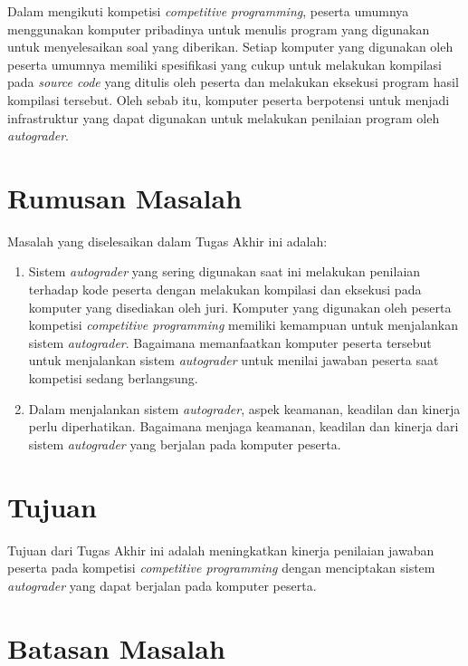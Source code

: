 \par Dalam mengikuti kompetisi \textit{competitive programming}, peserta umumnya menggunakan komputer pribadinya untuk menulis program yang digunakan untuk menyelesaikan soal yang diberikan. Setiap komputer yang digunakan oleh peserta umumnya memiliki spesifikasi yang cukup untuk melakukan kompilasi pada \textit{source code} yang ditulis oleh peserta dan melakukan eksekusi program hasil kompilasi tersebut. Oleh sebab itu, komputer peserta berpotensi untuk menjadi infrastruktur yang dapat digunakan untuk melakukan penilaian program oleh \textit{autograder}.

\section{Rumusan Masalah}

\par Masalah yang diselesaikan dalam Tugas Akhir ini adalah:
\begin{enumerate}

	\item Sistem \textit{autograder} yang sering digunakan saat ini melakukan penilaian terhadap kode peserta dengan melakukan kompilasi dan eksekusi pada komputer yang disediakan oleh juri. Komputer yang digunakan oleh peserta kompetisi \textit{competitive programming} memiliki kemampuan untuk menjalankan sistem \textit{autograder}. Bagaimana memanfaatkan komputer peserta tersebut untuk menjalankan sistem \textit{autograder} untuk menilai jawaban peserta saat kompetisi sedang berlangsung.
	
	\item Dalam menjalankan sistem \textit{autograder}, aspek keamanan, keadilan dan kinerja perlu diperhatikan. Bagaimana menjaga keamanan, keadilan dan kinerja dari sistem \textit{autograder} yang berjalan pada komputer peserta.

\end{enumerate}

\section{Tujuan}

\par Tujuan dari Tugas Akhir ini adalah meningkatkan kinerja penilaian jawaban peserta pada kompetisi \textit{competitive programming} dengan menciptakan sistem \textit{autograder} yang dapat berjalan pada komputer peserta.

\section{Batasan Masalah}

